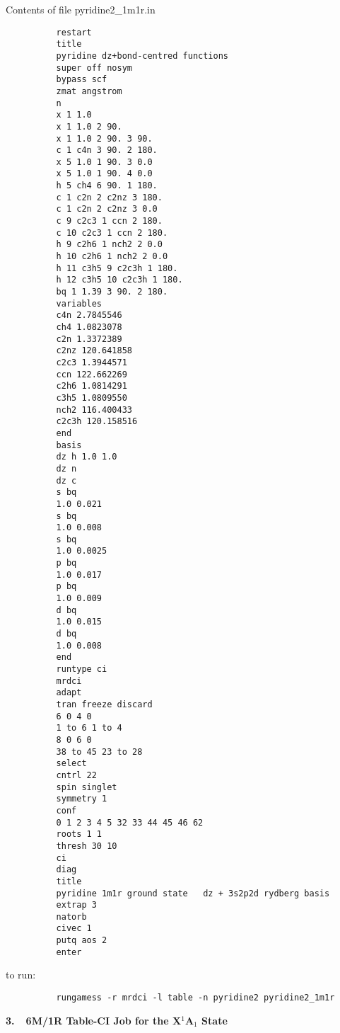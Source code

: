 \documentclass[11pt,fleqn]{article}
\begin{document}
Contents of file pyridine2\_1m1r.in
{
\footnotesize
\begin{verbatim}
          restart
          title
          pyridine dz+bond-centred functions
          super off nosym
          bypass scf
          zmat angstrom
          n
          x 1 1.0
          x 1 1.0 2 90.
          x 1 1.0 2 90. 3 90.
          c 1 c4n 3 90. 2 180.
          x 5 1.0 1 90. 3 0.0
          x 5 1.0 1 90. 4 0.0
          h 5 ch4 6 90. 1 180.
          c 1 c2n 2 c2nz 3 180.
          c 1 c2n 2 c2nz 3 0.0
          c 9 c2c3 1 ccn 2 180.
          c 10 c2c3 1 ccn 2 180.
          h 9 c2h6 1 nch2 2 0.0
          h 10 c2h6 1 nch2 2 0.0
          h 11 c3h5 9 c2c3h 1 180.
          h 12 c3h5 10 c2c3h 1 180.
          bq 1 1.39 3 90. 2 180.
          variables
          c4n 2.7845546
          ch4 1.0823078
          c2n 1.3372389
          c2nz 120.641858
          c2c3 1.3944571
          ccn 122.662269
          c2h6 1.0814291
          c3h5 1.0809550
          nch2 116.400433
          c2c3h 120.158516
          end
          basis
          dz h 1.0 1.0
          dz n
          dz c
          s bq
          1.0 0.021
          s bq
          1.0 0.008
          s bq
          1.0 0.0025
          p bq
          1.0 0.017
          p bq
          1.0 0.009
          d bq
          1.0 0.015
          d bq
          1.0 0.008
          end
          runtype ci
          mrdci
          adapt
          tran freeze discard
          6 0 4 0
          1 to 6 1 to 4
          8 0 6 0
          38 to 45 23 to 28
          select
          cntrl 22
          spin singlet
          symmetry 1
          conf
          0 1 2 3 4 5 32 33 44 45 46 62
          roots 1 1
          thresh 30 10
          ci
          diag
          title
          pyridine 1m1r ground state   dz + 3s2p2d rydberg basis
          extrap 3
          natorb
          civec 1
          putq aos 2
          enter
\end{verbatim}
}
to run:
{
\footnotesize
\begin{verbatim}
          rungamess -r mrdci -l table -n pyridine2 pyridine2_1m1r

\end{verbatim}
}
{\bf 3.~~6M/1R Table-CI Job for the X$^{1}$A$_{1}$ State}\\
\end{document}
